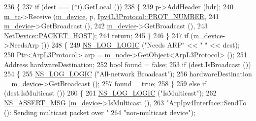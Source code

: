 \begin{DoxyCode}
236     \{
237       \textcolor{keywordflow}{if} (dest == (*i).GetLocal ())
238         \{
239           p->\hyperlink{classns3_1_1Packet_a465108c595a0bc592095cbcab1832ed8}{AddHeader} (hdr);
240           \hyperlink{classns3_1_1Ipv4Interface_a41ba88695bd05ab856a01d2e5ce556c3}{m\_tc}->Receive (\hyperlink{classns3_1_1Ipv4Interface_a67b77c15bcf3fb402c179796e04646b2}{m\_device}, p, \hyperlink{classns3_1_1Ipv4L3Protocol_a0146bc84815b7b73adb9c62cdafc9442}{Ipv4L3Protocol::PROT\_NUMBER},
241                          \hyperlink{classns3_1_1Ipv4Interface_a67b77c15bcf3fb402c179796e04646b2}{m\_device}->GetBroadcast (),
242                          \hyperlink{classns3_1_1Ipv4Interface_a67b77c15bcf3fb402c179796e04646b2}{m\_device}->GetBroadcast (),
243                          \hyperlink{classns3_1_1NetDevice_ace65153f09144f55a0d3e702fc29d6b2a60835731aced24ac0c712ba61e62462e}{NetDevice::PACKET\_HOST});
244           \textcolor{keywordflow}{return};
245         \}
246     \}
247   \textcolor{keywordflow}{if} (\hyperlink{classns3_1_1Ipv4Interface_a67b77c15bcf3fb402c179796e04646b2}{m\_device}->NeedsArp ())
248     \{
249       \hyperlink{group__logging_ga88acd260151caf2db9c0fc84997f45ce}{NS\_LOG\_LOGIC} (\textcolor{stringliteral}{"Needs ARP"} << \textcolor{stringliteral}{" "} << dest);
250       Ptr<ArpL3Protocol> arp = \hyperlink{classns3_1_1Ipv4Interface_a1790f3e2892779803599e5b7bb1fcbc9}{m\_node}->\hyperlink{classns3_1_1Object_a13e18c00017096c8381eb651d5bd0783}{GetObject}<ArpL3Protocol> ();
251       Address hardwareDestination;
252       \textcolor{keywordtype}{bool} found = \textcolor{keyword}{false};
253       \textcolor{keywordflow}{if} (dest.IsBroadcast ())
254         \{
255           \hyperlink{group__logging_ga88acd260151caf2db9c0fc84997f45ce}{NS\_LOG\_LOGIC} (\textcolor{stringliteral}{"All-network Broadcast"});
256           hardwareDestination = \hyperlink{classns3_1_1Ipv4Interface_a67b77c15bcf3fb402c179796e04646b2}{m\_device}->GetBroadcast ();
257           found = \textcolor{keyword}{true};
258         \}
259       \textcolor{keywordflow}{else} \textcolor{keywordflow}{if} (dest.IsMulticast ())
260         \{
261           \hyperlink{group__logging_ga88acd260151caf2db9c0fc84997f45ce}{NS\_LOG\_LOGIC} (\textcolor{stringliteral}{"IsMulticast"});
262           \hyperlink{assert_8h_aff5ece9066c74e681e74999856f08539}{NS\_ASSERT\_MSG} (\hyperlink{classns3_1_1Ipv4Interface_a67b77c15bcf3fb402c179796e04646b2}{m\_device}->IsMulticast (),
263                          \textcolor{stringliteral}{"ArpIpv4Interface::SendTo (): Sending multicast packet over "}
264                          \textcolor{stringliteral}{"non-multicast device"});

\end{DoxyCode}
